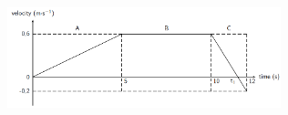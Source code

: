 \begin{enumerate}[noitemsep, label=\textbf{\arabic*}. ]
    \setcounter{subfigure}{0}


	\begin{figure}[H] %
    \begin{center}
    \label{m38796*id82798!!!underscore!!!media}\label{m38796*id82798!!!underscore!!!printimage}\includegraphics[width=300px]{col11305.imgs/m38796_PG10C2_055.png} %
        
      \vspace{2pt}
    \vspace{.1in}
    
    \end{center}

 \end{figure}   


\end{enumerate}
